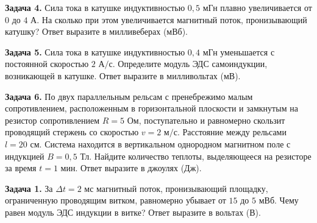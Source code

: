 \begin{taskbasic}[code={\label{task:elem_ind_v15_n12}}]
\textbf{Задача 4.} Сила тока в катушке индуктивностью $0{,}5\text{ мГн}$ плавно увеличивается от $0$ до $4\text{ А}$. На сколько при этом увеличивается магнитный поток, пронизывающий катушку? Ответ выразите в милливеберах (мВб).

\end{taskbasic}

\begin{taskbasic}[code={\label{task:elem_ind_v16_n12}}]
\textbf{Задача 5.} Сила тока в катушке индуктивностью $0{,}4\text{ мГн}$ уменьшается с постоянной скоростью $2\text{ А/с}$. Определите модуль ЭДС самоиндукции, возникающей в катушке. Ответ выразите в милливольтах (мВ).

\end{taskbasic}

\begin{taskbasic}[code={\label{task:elem_ind_v19_n23}}]
\textbf{Задача 6.} По двух параллельным рельсам с пренебрежимо малым сопротивлением, расположенным в горизонтальной плоскости и замкнутым на резистор сопротивлением $R = 5\text{ Ом}$, поступательно и равномерно скользит проводящий стержень со скоростью $v = 2\text{ м/с}$. Расстояние между рельсами $l = 20\text{ см}$. Система находится в вертикальном однородном магнитном поле с индукцией $B = 0{,}5\text{ Тл}$. Найдите количество теплоты, выделяющееся на резисторе за время $t = 1\text{ мин}$. Ответ выразите в джоулях (Дж).

\end{taskbasic}


\begin{taskbasic}[code={\label{task:elem_ind_v21_n12}}]
\textbf{Задача 1.} За $\Delta t = 2\text{ мс}$ магнитный поток, пронизывающий площадку, ограниченную проводящим витком, равномерно убывает от $15$ до $5\text{ мВб}$. Чему равен модуль ЭДС индукции в витке? Ответ выразите в вольтах (В).

\end{taskbasic}

